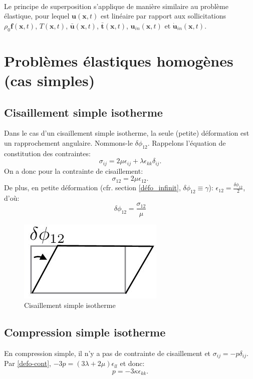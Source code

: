 \paragraph{}
Le principe de superposition s'applique de manière similaire au problème élastique, pour lequel $\textbf{u}(\textbf{x},t)$ est linéaire par rapport aux sollicitations $\rho_0\textbf{f}(\textbf{x},t)$, $T(\textbf{x},t)$, $\bar{\textbf{u}}(\textbf{x},t)$, $\bar{\textbf{t}}(\textbf{x},t)$, $\textbf{u}_{in}(\textbf{x},t)$ et $\dot{\textbf{u}}_{in}(\textbf{x},t)$.

\section{Problèmes élastiques homogènes (cas simples)}
\subsection{Cisaillement simple isotherme}
Dans le cas d'un cisaillement simple isotherme, la seule (petite) déformation est un rapprochement angulaire. Nommons-le $\delta\phi_{12}$. Rappelons l'équation de constitution des contraintes:
$$\sigma_{ij}=2\mu\epsilon_{ij}+\lambda\epsilon_{kk}\delta_{ij}.$$ On a donc pour la contrainte de cisaillement:
$$\sigma_{12}=2\mu\epsilon_{12}.$$ De plus, en petite déformation (cfr. section \ref{défo_infinit}, $\delta\phi_{12}\equiv \gamma$): $\epsilon_{12}=\frac{\delta\phi_{12}}{2}$, d'où:
$$\delta\phi_{12}=\frac{\sigma_{12}}{\mu}$$
\begin{figure}[!h]
\centering
\includegraphics[scale=0.6]{./cisaillementsimplefig.jpg}
\caption{Cisaillement simple isotherme}
\label{fig:cis}
\end{figure}
\subsection{Compression simple isotherme}
En compression simple, il n'y a pas de contrainte de cisaillement et $\sigma_{ij}=-p\delta_{ij}$. Par \ref{defo-cont}, $-3p=(3\lambda+2\mu)\epsilon_{ll}$ et donc: 
$$p=-3\kappa\epsilon_{kk}.$$

